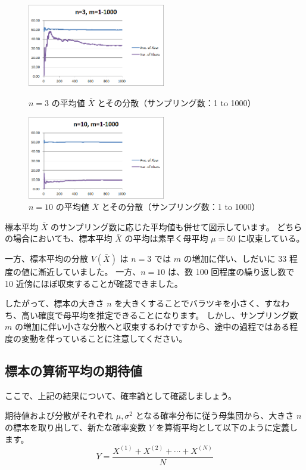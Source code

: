 \documentclass[uplatex,11pt,a4paper]{jsarticle}
\begin{document}
\begin{figure}[htb]
\begin{minipage}{0.5\hsize}
 \centering
	\includegraphics[width=6cm]{./figs/Xbar_n3_m1to1000.png}
	\caption{$n=3$ の平均値 $\bar{X}$ とその分散（サンプリング数：1 to 1000） }
	\label{fig: Xbar_V_n3}
\end{minipage}
\begin{minipage}{0.5\hsize}
 \centering
	\includegraphics[width=6cm]{./figs/Xbar_n10_m1to1000.png}
	\caption{$n=10$ の平均値 $\bar{X}$ とその分散（サンプリング数：1 to 1000） }
	\label{fig: Xbar_V_n10}
\end{minipage}
\end{figure}
標本平均 $\bar{X}$ のサンプリング数に応じた平均値も併せて図示しています。
どちらの場合においても、標本平均 $\bar{X}$ の平均は素早く母平均 $\mu = 50$ に収束している。

一方、標本平均の分散 $V(\bar{X})$ は $n=3$ では $m$ の増加に伴い、しだいに 33 程度の値に漸近していました。
一方、$n=10$ は、数 100 回程度の繰り返し数で 10 近傍にほぼ収束することが確認できました。

したがって、標本の大きさ $n$ を大きくすることでバラツキを小さく、すなわち、高い確度で母平均を推定できることになります。
しかし、サンプリング数 $m$ の増加に伴い小さな分散へと収束するわけですから、途中の過程ではある程度の変動を伴っていることに注意してください。


\subsection{標本の算術平均の期待値}
\label{sec:V_ave}

ここで、上記の結果について、確率論として確認しましょう。

期待値および分散がそれぞれ $\mu, \sigma^2$ となる確率分布に従う母集団から、大きさ $n$ の標本を取り出して、新たな確率変数 $Y$ を算術平均として以下のように定義します。
\begin{equation*}
Y= \dfrac{X^{(1)} + X^{(2)} + \cdots + X^{(N)} }{N}
\end{equation*}
\end{document}
